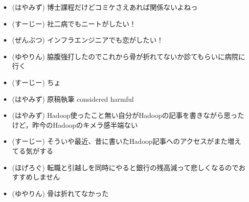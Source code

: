 
%
%

\begin{itemize}
 \item (はやみず) 博士課程だけどコミケさえあれば関係ないよねっ
 \item (すーじー) 社二病でもニートがしたい！
 \item (ぜんぶつ) インフラエンジニアでも恋がしたい！
 \item (ゆやりん) 脇腹強打したのでこれから骨が折れてないか診てもらいに病院に行く
 \item (すーじー) ちょ
 \item (はやみず) 原稿執筆 considered harmful
 \item (はやみず) Hadoop使ったこと無い自分がHadoopの記事を書きながら思ったけど，昨今のHadoopのキメラ感半端ない
 \item (すーじー) そういや最近、昔に書いたHadoop記事へのアクセスがまた増えてる気がする
 \item (ほげろぐ) 転職と引越しを同時にやると銀行の残高減って悲しくなるのでおすすめしません
 \item (ゆやりん) 骨は折れてなかった
\end{itemize}
